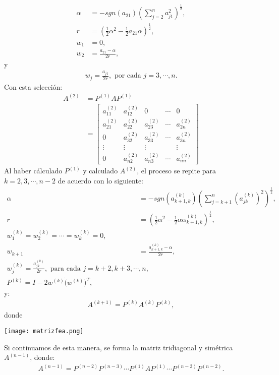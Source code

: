 \begin{align*}
  \alpha&=-sgn(a_{21})\left( \sum_{j=2}^{n}a_{j1}^2 \right)^{\frac{1}{2}},\\
  r&=\left( \frac{1}{2}\alpha^2-\frac{1}{2}a_{21}\alpha \right)^{\frac{1}{2}},\\
  w_1&=0,\\
  w_2&=\frac{a_{21}-\alpha}{2r},
\end{align*}
y
\begin{align*}
  w_{j}=\frac{a_{j1}}{2r},\text{ por cada }j=3,\cdots,n.
\end{align*}
Con esta selección:
\begin{align*}
  A^{(2)}&=P^{(1)}AP^{(1)}\\
  &=\begin{bmatrix}
    a_{11}^{(2)}& a_{12}^{(2)}& 0 & \cdots & 0 \\
    a_{21}^{(2)} & a_{22}^{(2)} & a_{23}^{(2)} & \cdots & a_{2n}^{(2)} \\
    0 & a_{32}^{(2)} & a_{33}^{(2)} & \cdots & a_{3n}^{(2)} \\
    \vdots & \vdots & \vdots &  & \vdots \\
    0 & a_{n2}^{(2)} & a_{n3}^{(2)} & \cdots & a_{nn}^{(2)}
  \end{bmatrix} 
\end{align*}
Al haber cálculado $P^{(1)}$ y calculado $A^{(2)}$, el proceso se repite para $k=2,3,\cdots,n-2$ de acuerdo con lo siguiente:
\begin{align*}
  \alpha&=-sgn(a_{k+1,k}^{(k)})\left( \sum_{j=k+1}^{n}(a_{jk}^{(k)})^{2} \right)^{\frac{1}{2}},\\
  r&=\left( \frac{1}{2}\alpha^2-\frac{1}{2}\alpha\alpha_{k+1,k}^{(k)} \right)^{\frac{1}{2}},\\
  w_1^{(k)}=w_{2}^{(k)}=\cdots=w_{k}^{(k)}=0,\\
  w_{k+1}&=\frac{a_{k+1,k}^{(k)}-\alpha}{2r},\\
  w_{j}^{(k)}=\frac{a_{jk}^{(k)}}{2r},\text{ para cada }j=k+2,k+3,\cdots,n,\\
  P^{(k)}=I-2w^{(k)}\dot(w^{(k)})^T,
\end{align*}
y:
\begin{align*}
  A^{(k+1)}=P^{(k)}A^{(k)}P^{(k)},
\end{align*}
donde
\begin{center}
  \texttt{[image: matrizfea.png]}
\end{center}
Si continuamos de esta manera, se forma la matriz tridiagonal y simétrica $A^{(n-1)}$, donde:
\begin{align*}
  A^{(n-1)}=P^{(n-2)}P^{(n-3)}\cdots P^{(1)}AP^{(1)}\cdots P^{(n-3)}P^{(n-2)}.
\end{align*}















